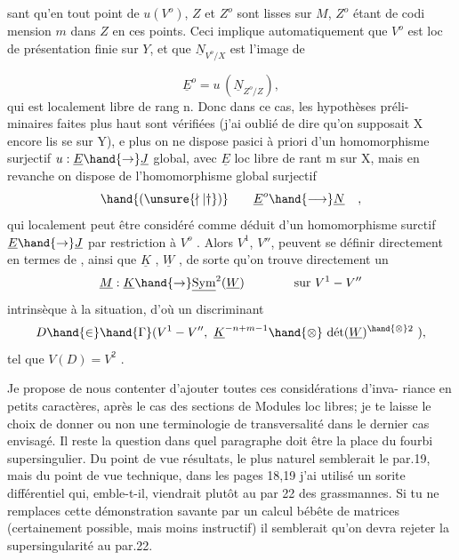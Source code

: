 
sant qu'en tout point de $u(V^{o})$, $Z$ et $Z^{o}$ sont lisses sur $M$, $Z^{o}$ étant de codi
mension $m$ dans $Z$ en ces points. Ceci implique automatiquement que $V^{o}$ est
loc de présentation finie sur $Y$, et que $\underline{N}_{V^{o}/X}$ est l'image de

\[ \underline{E}^{o} = u\,(\underline{N}_{Z^{o}/Z}) , \]
qui est localement libre de rang n. Donc dans ce cas, les hypothèses préli-%
minaires faites plus haut sont vérifiées (j'ai oublié de dire qu'on supposait
X encore lis se sur Y), e plus on ne dispose pasici à priori d'un homomorphisme
surjectif $u:\underline{E}\hand{\rightarrow}\underline{J}$ global, avec $\underline{E}$ loc libre de rant m sur X, mais en revanche
on dispose de l'homomorphisme global surjectif
\[ \hand{(\unsure{\nmid|\dagger})} \qquad \underline{E}^{o}\hand{\longrightarrow} \underline{N}_{} \quad , \]
qui localement peut être considéré comme déduit d'un homomorphisme surctif
$\underline{E}\hand{\rightarrow}\underline{J}$ par restriction à $V^{o}$ . Alors $V^{1}$, $V''$, peuvent se définir directement
en termes de \hand{(\unsure{\nmid|\dagger})} , ainsi que $\underline{K}$ , $\underline{W}$ , de sorte qu'on trouve directement un
\[ \underline{M} : \underline{K}\hand{\rightarrow} \underline{\mathrm{Sym}}^{2}(\underline{W}) \qquad\qquad \text{sur } V^{1}-V'' \]
intrinsèque à la situation, d'où  un discriminant
\[ D \hand{\in} \hand{\Gamma}(V^{1}-V'',\ \underline{K}^{-n+m-1}\hand{\otimes}\ \text{dét}(\underline{W})^{\hand{\otimes}2}\ ), \]
tel que $V(D) = V^{2}$ .

Je propose de nous contenter d'ajouter toutes ces considérations d'inva-%
riance en petits caractères, après le cas des sections de Modules loc libres;
je te laisse le choix de donner ou non une terminologie de transversalité dans
le dernier cas envisagé. Il reste la question dans quel paragraphe doit être
la place du fourbi supersingulier. Du point de vue résultats, le plus naturel
semblerait le par.19, mais du point de vue technique, dans les pages 18,19
j'ai utilisé un sorite différentiel qui, emble-t-il, viendrait plutôt au par
22 des grassmannes. Si tu ne remplaces cette démonstration savante par un
calcul bébête de matrices (certainement possible, mais moins instructif) il
semblerait qu'on devra rejeter la supersingularité au par.22.

